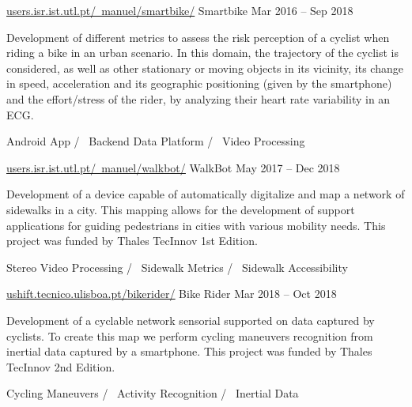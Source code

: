 

\begin{cventries}

  \cventry
	{\href{http://users.isr.ist.utl.pt/~manuel/smartbike/}{\underline{users.isr.ist.utl.pt/~manuel/smartbike/}}} %
	{Smartbike} %
	{Mar 2016 – Sep 2018} %
	{} %
	{
		\begin{cvitems} %
		Development of different metrics to assess the risk perception of a cyclist when riding a bike in an urban scenario. In this domain, the trajectory of the cyclist is considered, as well as other stationary or moving objects in its vicinity, its change in speed, acceleration and its geographic positioning (given by the smartphone) and the effort/stress of the rider, by analyzing their heart rate variability in an ECG.
		\end{cvitems}
	}
	{
		Android App /~
		Backend Data Platform /~
		Video Processing ~
	}

  \cventry
	{\href{http://users.isr.ist.utl.pt/~manuel/walkbot/}{\underline{users.isr.ist.utl.pt/~manuel/walkbot/}}} %
	{WalkBot} %
	{May 2017 – Dec 2018} %
	{} %
	{
		\begin{cvitems} %
			Development of a device capable of automatically digitalize and map a network of sidewalks in a city. This mapping allows for the  development of support applications for guiding pedestrians in cities with various mobility needs. This project was funded by Thales TecInnov 1st Edition.
		\end{cvitems}
	}
	{
		Stereo Video Processing /~
		Sidewalk Metrics /~
		Sidewalk Accessibility ~
	}

\cventry
	{\href{ushift.tecnico.ulisboa.pt/bikerider/}{\underline{ushift.tecnico.ulisboa.pt/bikerider/}}} %
	{Bike Rider} %
	{Mar 2018 – Oct 2018} %
	{} %
	{
		\begin{cvitems} %
			Development of a cyclable network sensorial supported on data captured by cyclists. To create this map we perform cycling maneuvers recognition from inertial data captured by a smartphone.
			This project was funded by Thales TecInnov 2nd Edition.
		\end{cvitems}
	}
	{
		Cycling Maneuvers /~
		Activity Recognition /~
		Inertial Data ~
	}


\end{cventries}
